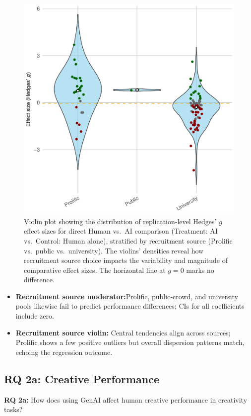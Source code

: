 \documentclass[manuscript, screen, review, acmsmall, anonymous]{acmart}
\begin{document}
\begin{figure}[H]
  \centering
  \includegraphics[width=\linewidth]{plot_versus_raw_violin_Recruitment_Source}
  \caption{Violin plot showing the distribution of replication‑level Hedges’ $g$ effect sizes for direct Human vs.\ AI comparison (Treatment: AI vs.\ Control: Human alone), stratified by recruitment source (Prolific vs.\ public vs.\ university). The violins’ densities reveal how recruitment source choice impacts the variability and magnitude of comparative effect sizes. The horizontal line at $g=0$ marks no difference.}
  \label{fig:versus_raw_violin_platform}
\end{figure}
\begin{itemize}
  \item \textbf{Recruitment source moderator:}Prolific, public‑crowd, and university pools likewise fail to predict performance differences; CIs for all coefficients include zero.
  \item \textbf{Recruitment source violin:} Central tendencies align across sources; Prolific shows a few positive outliers but overall dispersion patterns match, echoing the regression outcome.
\end{itemize}

\newpage
\subsection{RQ 2a: Creative Performance}
\label{sec:CreativePerformance}
\textbf{RQ 2a:} How does using GenAI affect human creative performance in creativity tasks? \\
\end{document}
